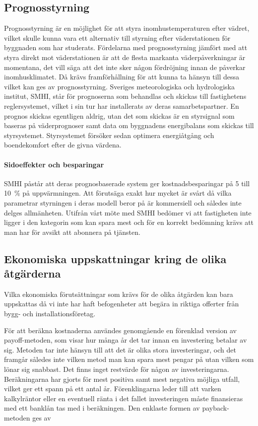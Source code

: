 \subsection{Prognosstyrning}
Prognosstyrning är en möjlighet för att styra inomhustemperaturen efter vädret, vilket skulle kunna vara ett alternativ till styrning efter väderstationen för byggnaden som har studerats.
Fördelarna med prognosstyrning jämfört med att styra direkt mot väderstationen är att de flesta markanta väderpåverkningar är momentana, det vill säga att det inte sker någon fördröjning innan de påverkar inomhusklimatet. Då krävs framförhållning för att kunna ta hänsyn till dessa vilket kan ges av prognosstyrning. Sveriges meteorologiska och hydrologiska institut, SMHI, står för prognoserna som behandlas och skickas till fastighetens reglersystemet, vilket i sin tur har installerats av deras samarbetspartner. En prognos skickas egentligen aldrig, utan det som skickas är en styrsignal som baseras på väderprognoser samt data om byggnadens energibalans som skickas till styrsystemet. Styrsystemet försöker sedan optimera energiåtgång och boendekomfort efter de givna värdena.

\paragraph{Sidoeffekter och besparingar}
SMHI påstår att deras prognosbaserade system ger kostnadsbesparingar på 5 till 10~\% på uppvärmningen. Att förutsäga exakt hur mycket är svårt då vilka parametrar styrningen i deras modell beror på är kommersiell och således inte delges allmänheten. Utifrån vårt möte med SMHI bedömer vi att fastigheten inte ligger i den kategorin som kan spara mest och för en korrekt bedömning krävs att man har för avsikt att abonnera på tjänsten.

\subsection{Ekonomiska uppskattningar kring de olika åtgärderna}
Vilka ekonomiska förutsättningar som krävs för de olika åtgärden kan bara uppskattas då vi inte har haft befogenheter att begära in riktiga offerter från bygg- och installationsföretag.

För att beräkna kostnaderna användes genomgående en förenklad version av payoff-metoden, som visar hur många år det tar innan en investering betalar av sig. Metoden tar inte hänsyn till att det är olika stora investeringar, och det framgår således inte vilken metod man kan spara mest pengar på utan vilken som lönar sig snabbast. Det finns inget restvärde för någon av investeringarna. Beräkningarna har gjorts för mest positiva samt mest negativa möjliga utfall, vilket ger ett spann på ett antal år. Förenklingarna leder till att varken kalkylräntor eller en eventuell ränta i det fallet investeringen måste finansieras med ett banklån tas med i beräkningen. Den enklaste formen av payback-metoden ges av

